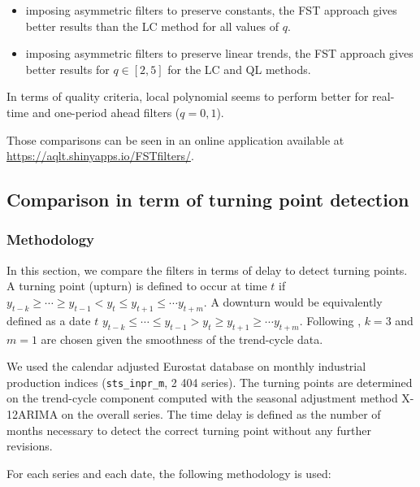 \documentclass[fleqn,10pt]{latex/stylish_article} %
\newcommand\1{\mathds{1}}
\begin{document}
\begin{itemize}
\item
  imposing asymmetric filters to preserve constants, the FST approach gives better results than the LC method for all values of \(q\).
\item
  imposing asymmetric filters to preserve linear trends, the FST approach gives better results for \(q\in[2,5]\) for the LC and QL methods.
\end{itemize}

\faArrowCircleRight{} In terms of quality criteria, local polynomial seems to perform better for real-time and one-period ahead filters (\(q=0,1\)).

Those comparisons can be seen in an online application available at \url{https://aqlt.shinyapps.io/FSTfilters/}.

\hypertarget{comparison-in-term-of-turning-point-detection}{%
\subsection{Comparison in term of turning point detection}\label{comparison-in-term-of-turning-point-detection}}

\hypertarget{methodology}{%
\subsubsection{Methodology}\label{methodology}}

In this section, we compare the filters in terms of delay to detect turning points.
A turning point (upturn) is defined to occur at time \(t\) if \(y_{t-k}\geq\cdots\geq y_{t-1}<y_t\leq y_{t+1}\leq\cdots y_{t+m}\).
A downturn would be equivalently defined as a date \(t\) \(y_{t-k}\leq\cdots\leq y_{t-1}>y_t\geq y_{t+1}\geq\cdots y_{t+m}\).
Following \citet{Zellner1991}, \(k=3\) and \(m=1\) are chosen given the smoothness of the trend-cycle data.

We used the calendar adjusted Eurostat database on monthly industrial production indices (\texttt{sts\_inpr\_m}, 2 404 series). The turning points are determined on the trend-cycle component computed with the seasonal adjustment method X-12ARIMA on the overall series. The time delay is defined as the number of months necessary to detect the correct turning point without any further revisions.

For each series and each date, the following methodology is used:
\end{document}
